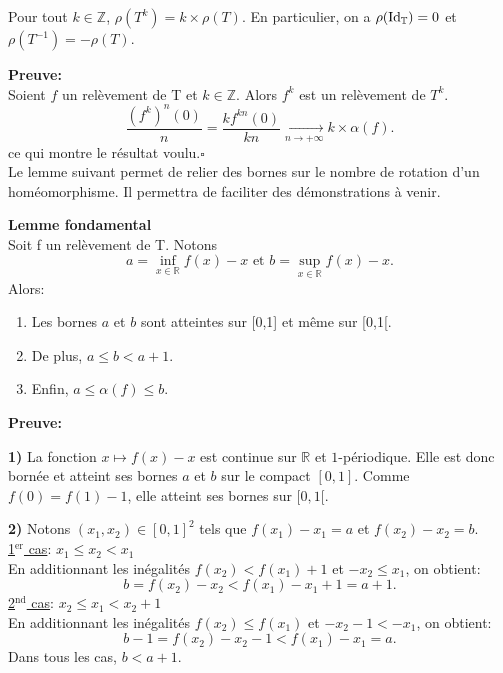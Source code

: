 \begin{proposition}\label{k rho}
	Pour tout $k \in \mathbb{Z}$, $\rho(T^k)= k \times \rho(T)$. En particulier, on a $\rho(\mathrm{Id_{{\mathbb{T}}}})=0$ et $\rho(T^{-1})=-\rho(T)$.
\end{proposition}

\textbf{Preuve:}\\
Soient $f$ un relèvement de T et $k \in \mathbb{Z}$. Alors $f^k$ est un relèvement de $T^k$.
$$\frac{(f^k)^n(0)}{n}=\frac{kf^{kn}(0)}{kn}\underset{n \to + \infty}{\longrightarrow} k \times \alpha(f).$$
ce qui montre le résultat voulu.\hfill $\square$\\





Le lemme suivant permet de relier des bornes sur le nombre de rotation d'un homéomorphisme. Il permettra de faciliter des démonstrations à venir.


\begin{lemma}\label{bornesnbrot}\textbf{Lemme fondamental}\\
	Soit f un relèvement de T. Notons $$a=\underset{x \in \mathbb{R}}{\inf} f(x) - x \text{ et } b=\underset{x \in \mathbb{R}}{\sup} f(x) - x.$$
Alors:
\begin{enumerate}
	\item Les bornes $a$ et $b$ sont atteintes sur [0,1] et même sur [0,1[.
	\item De plus, $a \leq b < a + 1$.
	\item Enfin, $a \leq \alpha(f) \leq b$.
\end{enumerate}
\end{lemma}

	\textbf{Preuve:}
	\par\textbf{1)} La fonction $x\mapsto f(x)-x$ est continue sur $\mathbb{R}$ et $1$-périodique. Elle est donc bornée et atteint ses bornes $a$ et $b$ sur le compact $[0,1]$. Comme $f(0)=f(1)-1$, elle atteint ses bornes sur $[0,1[$. \\

	\par\textbf{2) }Notons $(x_1,x_2) \in [0,1]^2$ tels que $f(x_1)-x_1=a$ et $f(x_2)-x_2=b$.\\
	\underline{1$^{\mathrm{er}}$ cas}: $x_1 \leq x_2 < x_1$\\
	En additionnant les inégalités $f(x_2) < f(x_1)+1$ et $-x_2 \leq x_1$, on obtient:
	$$b=f(x_2) - x_2 < f(x_1) - x_1 + 1 = a+1.$$
	\underline{2$^{\mathrm{nd}}$ cas}: $x_2 \leq x_1 < x_2+1$\\
	En additionnant les inégalités $f(x_2) \leq f(x_1)$ et $-x_2 -1 < -x_1$, on obtient:
	$$b-1 = f(x_2)-x_2 -1 < f(x_1)-x_1 =a.$$
	Dans tous les cas, $b<a+1$.\\

